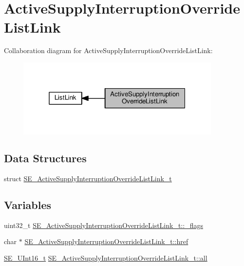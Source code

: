 \hypertarget{group__ActiveSupplyInterruptionOverrideListLink}{}\section{Active\+Supply\+Interruption\+Override\+List\+Link}
\label{group__ActiveSupplyInterruptionOverrideListLink}
Collaboration diagram for Active\+Supply\+Interruption\+Override\+List\+Link\+:\nopagebreak
\begin{figure}[H]
\begin{center}
\leavevmode
\includegraphics[width=289pt]{group__ActiveSupplyInterruptionOverrideListLink}
\end{center}
\end{figure}
\subsection*{Data Structures}
\begin{DoxyCompactItemize}
\item 
struct \hyperlink{structSE__ActiveSupplyInterruptionOverrideListLink__t}{S\+E\+\_\+\+Active\+Supply\+Interruption\+Override\+List\+Link\+\_\+t}
\end{DoxyCompactItemize}
\subsection*{Variables}
\begin{DoxyCompactItemize}
\item 
uint32\+\_\+t \hyperlink{group__ActiveSupplyInterruptionOverrideListLink_ga677c718c6e02ec5c25394ebb31346416}{S\+E\+\_\+\+Active\+Supply\+Interruption\+Override\+List\+Link\+\_\+t\+::\+\_\+flags}
\item 
char $\ast$ \hyperlink{group__ActiveSupplyInterruptionOverrideListLink_gab55929cb1920537dc47faecbc7aff86d}{S\+E\+\_\+\+Active\+Supply\+Interruption\+Override\+List\+Link\+\_\+t\+::href}
\item 
\hyperlink{group__UInt16_gac68d541f189538bfd30cfaa712d20d29}{S\+E\+\_\+\+U\+Int16\+\_\+t} \hyperlink{group__ActiveSupplyInterruptionOverrideListLink_ga7e9d6b59a56049d25547596f95b40559}{S\+E\+\_\+\+Active\+Supply\+Interruption\+Override\+List\+Link\+\_\+t\+::all}
\end{DoxyCompactItemize}


